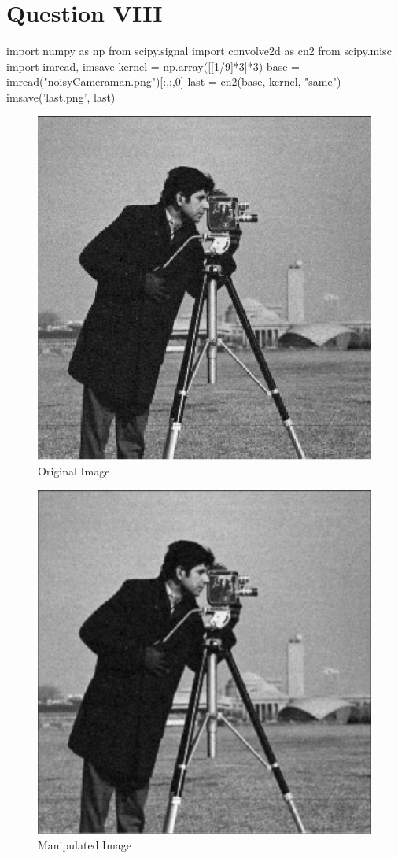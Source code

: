 \documentclass[a4paper, 12pt, titlepage]{article}
\begin{document}
\section{Question VIII}
\begin{python}
import numpy as np
from scipy.signal import convolve2d as cn2 
from scipy.misc import imread, imsave
kernel = np.array([[1/9]*3]*3)
base = imread("noisyCameraman.png")[:,:,0]
last = cn2(base, kernel, "same")
imsave('last.png', last)
\end{python}
\begin{figure}[H]
	\centering
	\caption{Original Image }
	\label{fig:Graphic}
	\includegraphics[scale=0.5]{noisyCameraman.png} %
\end{figure}
    \begin{figure}[H]
	\centering
	\caption{Manipulated Image }
	\label{fig:Graphic}
	\includegraphics[scale=0.3]{last.png} %
\end{figure}
\end{document}
